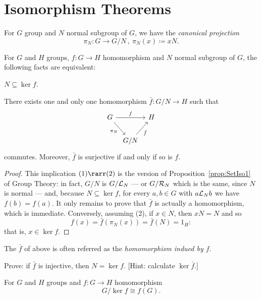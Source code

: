 
\section{Isomorphism Theorems}

For \(G\) group and \(N\) normal subgroup of \(G\), we have the {\em canonical projection}
\[\pi_N : G \to G/N\,, \ \pi_N(x) \coloneq xN .\]

\begin{lemma}\label{lemma:GrpIso0}
For \(G\) and \(H\) groups, \(f : G \to H\) homomorphism and \(N\) normal subgroup of \(G\), the following facts are equivalent:
\begin{tcbenum}
\item \(N \subseteq \ker f\).
\item There exists one and only one homomorphism \(\bar f : G/N \to H\) such that
\[\begin{tikzcd}[column sep=tiny, ampersand replacement=\&]
G \ar["f", rr] \ar["{\pi_N}", swap, dr] \& \& H \\
\& G/N \ar["{\bar f}", swap, ur]
\end{tikzcd}\]
commutes. Moreover, \(\bar f\) is surjective if and only if so is \(f\).
\end{tcbenum}
\end{lemma}

\begin{proof}
This implication \((1) \rarr (2)\) is the version of Proposition~\ref{prop:SetIso1} of Group Theory: in fact, \(G/N\) is \(G/\mathcal L_N\) --- or \(G/\mathcal R_N\) which is the same, since \(N\) is normal --- and, because \(N \subseteq \ker f\), for every \(a, b \in G\) with \(a \mathcal L_N b\) we have \(f(b) = f(a)\). It only remains to prove that \(\bar f\) is actually a homomorphism, which is immediate.\newline
Conversely, assuming (2), if \(x \in N\), then \(xN = N\) and so
\[f(x) = \bar f (\pi_N (x)) = \bar f (N) = 1_H :\]
that is, \(x \in \ker f\).
\end{proof}

The \(\bar f\) of above is often referred as the {\em homomorphism indued by \(f\)}.

\begin{exercise}
Prove: if \(\bar f\) is injective, then \(N = \ker f\). [Hint: calculate \(\ker \bar f\).]
\end{exercise}

\begin{proposition}\label{proposition:GrpIso1}
For \(G\) and \(H\) groups and \(f : G \to H\) homomorphism
\[{G}{/}{\ker f} \cong f(G) .\]
\end{proposition}

